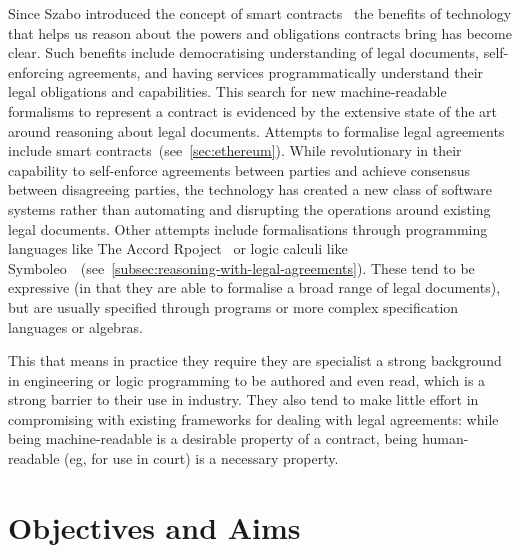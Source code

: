 Since Szabo introduced the concept of smart contracts~\cite{szabo1997smart-contracts} the benefits of technology that helps us reason about the powers and obligations contracts bring has become clear.
Such benefits include democratising understanding of legal documents, self-enforcing agreements, and having services programmatically understand their legal obligations and capabilities.
This search for new machine-readable formalisms to represent a contract is evidenced by the extensive state of the art around reasoning about legal documents.
Attempts to formalise legal agreements include smart contracts~(see~\autoref{sec:ethereum}).
While revolutionary in their capability to self-enforce agreements between parties and achieve consensus between disagreeing parties, the technology has created a new class of software systems rather than automating and disrupting the operations around existing legal documents.
Other attempts include formalisations through programming languages like The Accord Rpoject~\cite{accordHomepage} or logic calculi like Symboleo~\cite{symboleo2020}~(see~\autoref{subsec:reasoning-with-legal-agreements}).
These tend to be expressive (in that they are able to formalise a broad range of legal documents),
but are usually specified through programs or more complex specification languages or algebras.

This that means in practice they require they are specialist a strong background in engineering or logic programming to be authored and even read, which is a strong barrier to their use in industry.
They also tend to make little effort in compromising with existing frameworks for dealing with legal agreements: while being machine-readable is a desirable property of a contract, being human-readable (eg, for use in court) is a necessary property.



\section{Objectives and Aims}\label{sec:objectives-and-aims}

